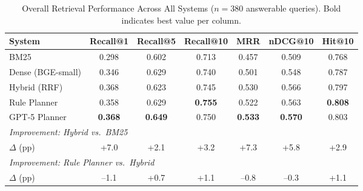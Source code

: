 
\begin{table}[ht]
\centering
\caption{Overall Retrieval Performance Across All Systems ($n{=}380$ answerable queries). Bold indicates best value per column.}
\label{tab:retrieval_performance}
\begin{tabular}{lcccccc}
\toprule
\textbf{System} & \textbf{Recall@1} & \textbf{Recall@5} & \textbf{Recall@10} & \textbf{MRR} & \textbf{nDCG@10} & \textbf{Hit@10} \\
\midrule
BM25                & 0.298 & 0.602 & 0.713 & 0.457 & 0.509 & 0.768 \\
Dense (BGE-small)   & 0.346 & 0.629 & 0.740 & 0.501 & 0.548 & 0.787 \\
Hybrid (RRF)        & 0.368 & 0.623 & 0.745 & 0.530 & 0.566 & 0.797 \\
Rule Planner        & 0.358 & 0.629 & \textbf{0.755} & 0.522 & 0.563 & \textbf{0.808} \\
GPT-5 Planner       & \textbf{0.368} & \textbf{0.649} & 0.750 & \textbf{0.533} & \textbf{0.570} & 0.803 \\
\midrule
\multicolumn{7}{l}{\textit{Improvement: Hybrid vs.\ BM25}} \\
$\Delta$ (pp)       & +7.0  & +2.1  & +3.2  & +7.3  & +5.8  & +2.9  \\
\multicolumn{7}{l}{\textit{Improvement: Rule Planner vs.\ Hybrid}} \\
$\Delta$ (pp)       & --1.1 & +0.7  & +1.1  & --0.8 & --0.3 & +1.1  \\
\bottomrule
\end{tabular}
\end{table}



